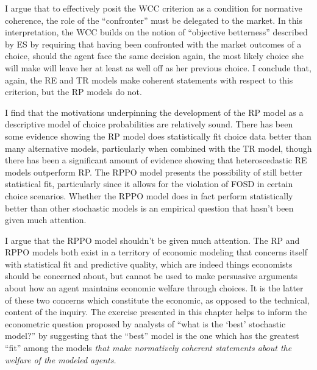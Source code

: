 \documentclass[../main.tex]{subfiles}
\begin{document}
I argue that to effectively posit the WCC criterion as a condition for normative coherence, the role of the \enquote{confronter} must be delegated to the market.
In this interpretation, the WCC builds on the notion of \enquote{objective betterness} described by ES by requiring that having been confronted with the market outcomes of a choice, should the agent face the same decision again, the most likely choice she will make will leave her at least as well off as her previous choice.
I conclude that, again, the RE and TR models make coherent statements with respect to this criterion, but the RP models do not.

I find that the motivations underpinning the development of the RP model as a descriptive model of choice probabilities are relatively sound.
There has been some evidence showing the RP model does statistically fit choice data better than many alternative models, particularly when combined with the TR model, though there has been a significant amount of evidence showing that heteroscedastic RE models outperform RP.
The RPPO model presents the possibility of still better statistical fit, particularly since it allows for the violation of FOSD in certain choice scenarios.{\footnotemark}
Whether the RPPO model does in fact perform statistically better than other stochastic models is an empirical question that hasn't been given much attention.

\addtocounter{footnote}{-1}

I argue that the RPPO model shouldn't be given much attention.
The RP and RPPO models both exist in a territory of economic modeling that concerns itself with statistical fit and predictive quality, which are indeed things economists should be concerned about, but cannot be used to make persuasive arguments about how an agent maintains economic welfare through choices.
It is the latter of these two concerns which constitute the economic, as opposed to the technical, content of the inquiry.
The exercise presented in this chapter helps to inform the econometric question proposed by analysts of \enquote{what is the \enquote{best} stochastic model?} by suggesting that the \enquote{best} model is the one which has the greatest \enquote{fit} among the models \textit{that make normatively coherent statements about the welfare of the modeled agents.}
\end{document}
